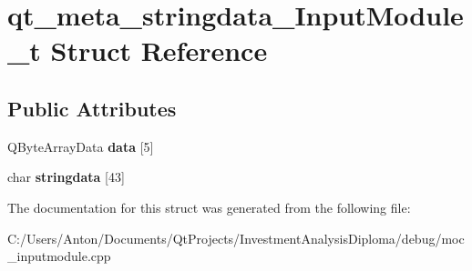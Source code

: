 \hypertarget{structqt__meta__stringdata___input_module__t}{}\section{qt\+\_\+meta\+\_\+stringdata\+\_\+\+Input\+Module\+\_\+t Struct Reference}
\label{structqt__meta__stringdata___input_module__t}
\subsection*{Public Attributes}
\begin{DoxyCompactItemize}
\item 
\hypertarget{structqt__meta__stringdata___input_module__t_ab59ad6414e4eb7c57ff3b0e4af9c6d08}{}Q\+Byte\+Array\+Data {\bfseries data} \mbox{[}5\mbox{]}\label{structqt__meta__stringdata___input_module__t_ab59ad6414e4eb7c57ff3b0e4af9c6d08}

\item 
\hypertarget{structqt__meta__stringdata___input_module__t_a0a684ba2b7abac40795ce4c1f62d9e00}{}char {\bfseries stringdata} \mbox{[}43\mbox{]}\label{structqt__meta__stringdata___input_module__t_a0a684ba2b7abac40795ce4c1f62d9e00}

\end{DoxyCompactItemize}


The documentation for this struct was generated from the following file\+:\begin{DoxyCompactItemize}
\item 
C\+:/\+Users/\+Anton/\+Documents/\+Qt\+Projects/\+Investment\+Analysis\+Diploma/debug/moc\+\_\+inputmodule.\+cpp\end{DoxyCompactItemize}
